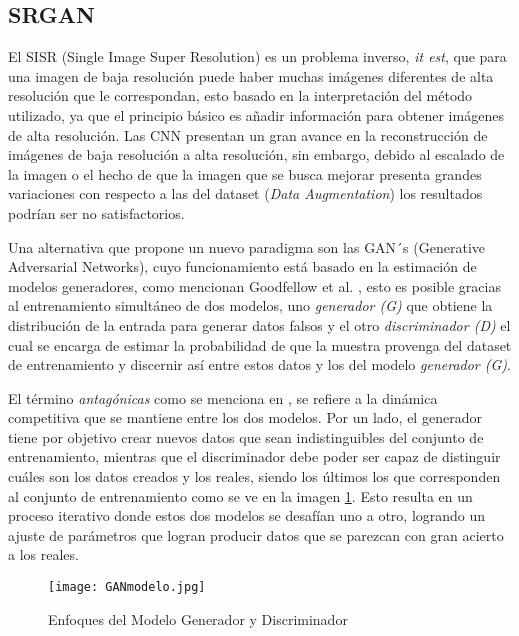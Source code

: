 \subsection{SRGAN}

El SISR (Single Image Super Resolution) es un problema inverso, \emph{it est}, que para una imagen de baja resolución puede haber muchas
imágenes diferentes de alta resolución que le correspondan, esto basado en la interpretación del método utilizado, ya que
el principio básico es añadir información para obtener imágenes de alta resolución.
Las CNN presentan un gran avance en la reconstrucción de imágenes de baja resolución a alta resolución,
sin embargo, debido al escalado de la imagen o el hecho de que la imagen que se busca mejorar presenta grandes
variaciones con respecto a las del dataset (\emph{Data Augmentation}) los resultados podrían ser no satisfactorios.


Una alternativa que propone un nuevo paradigma son las GAN´s (Generative Adversarial Networks), cuyo funcionamiento está basado
en la estimación de modelos generadores, como mencionan Goodfellow et al. \cite{GANs}, esto es 
posible gracias al entrenamiento simultáneo de dos modelos, uno \emph{generador (G)} que obtiene 
la distribución de la entrada para generar datos falsos y el otro \emph{discriminador (D)} el cual se encarga de estimar 
la probabilidad de que la muestra provenga del dataset de entrenamiento y discernir así entre estos datos y 
los del modelo \emph{ generador (G)}.

El término \emph{antagónicas} como se menciona en \cite{SRGAN_Tesis}, se refiere a la dinámica 
competitiva que se mantiene entre los dos modelos. Por un lado,
el generador tiene por objetivo crear nuevos datos que sean indistinguibles del
conjunto de entrenamiento, mientras que el discriminador debe poder ser capaz
de distinguir cuáles son los datos creados y los reales, siendo los últimos los que corresponden
 al conjunto de entrenamiento como se ve en la imagen \ref{Alexis1}. Esto resulta en un proceso iterativo donde estos dos modelos
 se desafían uno a otro, logrando un ajuste de parámetros
 que logran producir datos que se parezcan con gran acierto a los reales.
 

\begin{figure}[H]
    \begin{center}
      \texttt{[image: GANmodelo.jpg]}
      \caption{Enfoques del Modelo Generador y Discriminador}
      \label{Alexis1}
    \end{center}
\end{figure}


